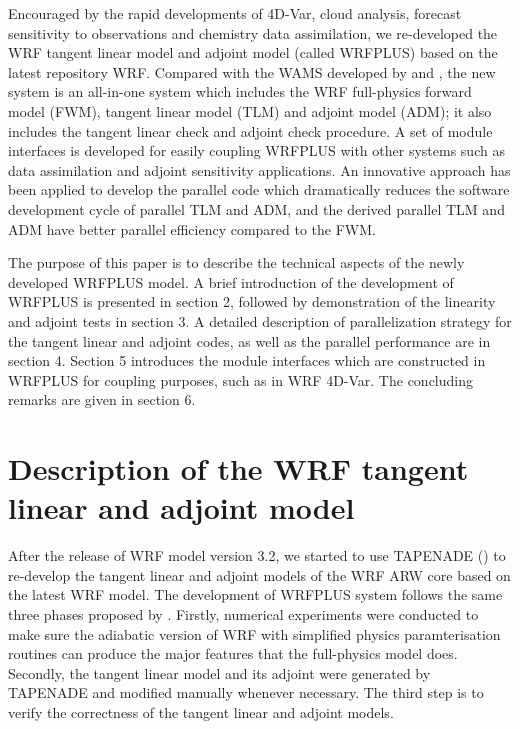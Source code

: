 \documentclass[12pt]{article}
\begin{document}
Encouraged by the rapid developments of  4D-Var, cloud analysis, forecast sensitivity to observations and chemistry data assimilation, we re-developed the WRF tangent linear model and adjoint model (called WRFPLUS) based on the latest repository WRF. Compared with the WAMS developed by \cite{Xiao2008} and \cite{Huang2009}, the new system is an all-in-one system which includes the WRF full-physics forward model (FWM), tangent linear model (TLM) and adjoint model (ADM); it also includes the tangent linear check and adjoint check procedure. A set of module interfaces is developed for easily coupling WRFPLUS with other systems such as data assimilation and adjoint sensitivity applications.  An innovative approach has been applied to develop the parallel code which dramatically reduces the software development cycle of parallel TLM and ADM, and the derived parallel TLM and ADM have better parallel efficiency compared to the FWM.

The purpose of this paper is to describe the technical aspects of the newly developed WRFPLUS model. A brief introduction of the development of WRFPLUS is presented in section 2, followed by demonstration of the linearity and adjoint tests in section 3. A detailed description of parallelization strategy for the tangent linear and adjoint codes, as well as the parallel performance are in section 4. Section 5 introduces the module interfaces which are constructed in WRFPLUS for coupling purposes, such as in WRF 4D-Var. The concluding remarks are given in section 6.

\section{Description of the WRF tangent linear and adjoint model}

After the release of WRF model version 3.2, we started to use TAPENADE (\cite{Hascoet2004T2u}) to re-develop the tangent linear and adjoint models of the WRF ARW core based on the latest WRF model. The development of WRFPLUS system follows the same three phases proposed by \cite{Xiao2008}. Firstly, numerical experiments were conducted to make sure the adiabatic version of WRF with simplified physics paramterisation routines can produce the major features that the full-physics model does. Secondly, the tangent linear model and its adjoint were generated by TAPENADE and modified manually whenever necessary. The third step is to verify the correctness of the tangent linear and adjoint models.
\end{document}
